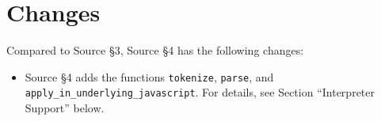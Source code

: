 





\section{Changes}

Compared to Source \S 3, Source \S 4 has the following changes:
\begin{itemize}
\item Source \S 4 adds the functions \lstinline{tokenize}, \lstinline{parse}, and
\lstinline{apply_in_underlying_javascript}. 
For details, see 
Section ``Interpreter Support'' below.
\end{itemize}





\newpage







































\newpage



\newpage



    
